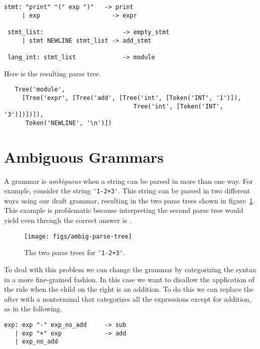 \documentclass[7x10]{TimesAPriori_MIT}%
\numberwithin{theorem}{chapter}
\numberwithin{definition}{chapter}
\numberwithin{equation}{chapter}
\begin{document}
{\begin{center}
\begin{minipage}{0.95\textwidth}
\begin{lstlisting}[escapechar=$]
 stmt: "print" "(" exp ")"   -> print
     | exp                    -> expr

 stmt_list:                      -> empty_stmt
     | stmt NEWLINE stmt_list -> add_stmt

 lang_int: stmt_list             -> module
\end{lstlisting}
\end{minipage}
\end{center}
Here is the resulting parse tree. 
\begin{lstlisting}
   Tree('module',
     [Tree('expr', [Tree('add', [Tree('int', [Token('INT', '1')]),
                                    Tree('int', [Token('INT', '3')])])]),
      Token('NEWLINE', '\n')])
\end{lstlisting}

\section{Ambiguous Grammars}

A grammar is \emph{ambiguous} when a string
can be parsed in more than one way. For example, consider the string
\lstinline{'1-2+3'}.  This string can be parsed in two different ways using
our draft grammar, resulting in the two parse trees shown in
figure~\ref{fig:ambig-parse-tree}. This example is problematic because
interpreting the second parse tree would yield  even through
the correct answer is .

\begin{figure}[tbp]
\begin{tcolorbox}[colback=white]
\centering
\texttt{[image: figs/ambig-parse-tree]}
\end{tcolorbox}
\caption{The two parse trees for \lstinline{'1-2+3'}.}
\label{fig:ambig-parse-tree}
\end{figure}

To deal with this problem we can change the grammar by categorizing
the syntax in a more fine-grained fashion. In this case we want to
disallow the application of the rule  when the
child on the right is an addition.  To do this we can replace the
 after  with a nonterminal that categorizes all
the expressions except for addition, as in the following.
\begin{center}
\begin{minipage}{0.95\textwidth}
\begin{lstlisting}[escapechar=$]
exp: exp "-" exp_no_add     -> sub
   | exp "+" exp            -> add
   | exp_no_add


\end{lstlisting}
\end{minipage}
\end{center}}
\end{document}
